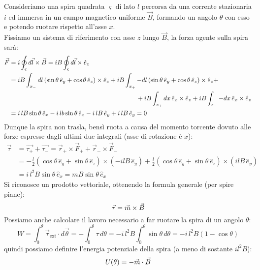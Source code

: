 \documentclass[]{article}
\begin{document}
Consideriamo una spira quadrata $ \varsigma $ di lato $ l $ percorsa da una corrente stazionaria $ i $ ed immersa in un campo magnetico uniforme $ \vec{B} $, formando un angolo $ \theta $ con esso e potendo ruotare rispetto all'asse $ x $. \\ 
%
Fissiamo un sistema di riferimento con asse $ z $ lungo $ \vec{B} $, la forza agente sulla spira sarà:
\begin{equation}
	\begin{split}
		\vec{F} &= i \oint_{\varsigma} d\vec{l}\times\vec{B} = i B \oint_{\varsigma} d\vec{l}\times\hat{e}_z \\ 
			&= iB\int_{x_-} dl \left(\sin\theta\,\hat{e}_y + \cos\theta\,\hat{e}_z\right) \times \hat{e}_z + iB\int_{x_+} -dl \left(\sin\theta\,\hat{e}_y + \cos\theta\,\hat{e}_z\right) \times \hat{e}_z + \\ 
			& \qquad\qquad\qquad\qquad\qquad\qquad\qquad\qquad\qquad\qquad + iB\int_{z_+} dx \, \hat{e}_x \times \hat{e}_z + iB\int_{z_-} -dx \,\hat{e}_x \times \hat{e}_z \\ 
			&= i\,lB\sin\theta\,\hat{e}_x - i\,lb\sin\theta\,\hat{e}_x - i\,lB\,\hat{e}_y + i\,lB\,\hat{e}_y = 0
	\end{split}
	\label{eq:}
\end{equation}
Dunque la spira non trasla, bensì ruota a causa del momento torcente dovuto alle forze espresse dagli ultimi due integrali (asse di rotazione è $ x $):
\begin{equation}
	\begin{split}
		\vec{\tau} &= \vec{\tau_+} + \vec{\tau_-} = \vec{r}_+ \times \vec{F}_+ + \vec{r}_- \times \vec{F}_- \\ 
			   &= -\frac{l}{2} \left(\cos\theta\,\hat{e}_y + \sin\theta\,\hat{e}_z\right) \times \left(-ilB\,\hat{e}_y\right) + \frac{l}{2} \left(\cos\theta\,\hat{e}_y + \sin\theta\,\hat{e}_z\right) \times \left(ilB\,\hat{e}_y\right) \\ 
			   &= i \, l^2 B \sin\theta \,\hat{e}_x = m B \sin\theta\,\hat{e}_x
	\end{split}
	\label{eq:calc-mom-sp}
\end{equation}
Si riconosce un prodotto vettoriale, ottenendo la formula generale (per spire piane):
\begin{equation}
	\vec{\tau} = \vec{m}\times\vec{B}
	\label{eq:mom-sp}
\end{equation}
Possiamo anche calcolare il lavoro necessario a far ruotare la spira di un angolo $ \theta $:
\begin{equation}
	W = \int_0^{\theta} \vec{\tau}_{\text{ext}} \cdot d\vec{\theta} = - \int_0^{\theta} \tau \, d\theta = - i \, l^2 B \int_0^{\theta} \sin\theta \,d\theta = - i \, l^2 B \left(1 - \cos\theta\right)
	\label{eq:}
\end{equation}
quindi possiamo definire l'energia potenziale della spira (a meno di sostante $ il^2 B $):
\begin{equation}
	U(\theta) = -\vec{m}\cdot\vec{B}
	\label{eq:pot-sp}
\end{equation}
\end{document}
